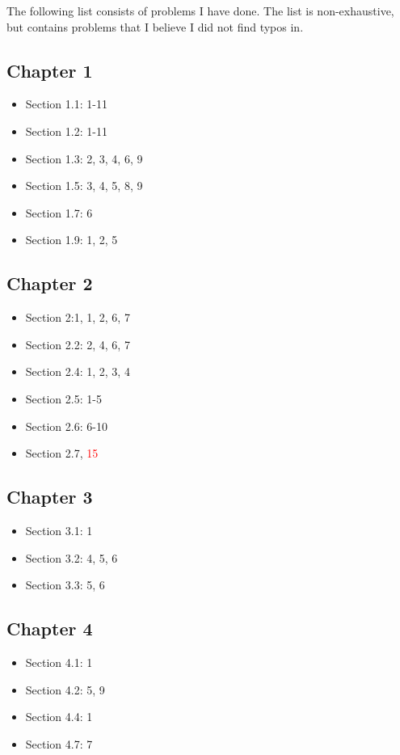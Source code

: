 \documentclass[11pt]{article}
\theoremstyle{definition}
\begin{document}
The following list consists of problems I have done. The list is non-exhaustive, but contains problems that I believe I did not find typos in. 
\subsection{Chapter 1}
\begin{itemize}
  \item Section 1.1: 1-11
  \item Section 1.2: 1-11
  \item Section 1.3: 2, 3, 4, 6, 9
  \item Section 1.5: 3, 4, 5, 8, 9
  \item Section 1.7: 6
  \item Section 1.9: 1, 2, 5
\end{itemize}

\subsection{Chapter 2}
\begin{itemize}
  \item Section 2:1, 1, 2, 6, 7
  \item Section 2.2: 2, 4, 6, 7
  \item Section 2.4: 1, 2, 3, 4
  \item Section 2.5: 1-5
  \item Section 2.6: 6-10
  \item Section 2.7, \textcolor{red}{15}
\end{itemize}

\subsection{Chapter 3}
\begin{itemize}
  \item Section 3.1: 1
  \item Section 3.2: 4, 5, 6
  \item Section 3.3: 5, 6
\end{itemize}

\subsection{Chapter 4}
\begin{itemize}
  \item Section 4.1: 1
  \item Section 4.2: 5, 9
  \item Section 4.4: 1
  \item Section 4.7: 7
\end{itemize}
\end{document}
